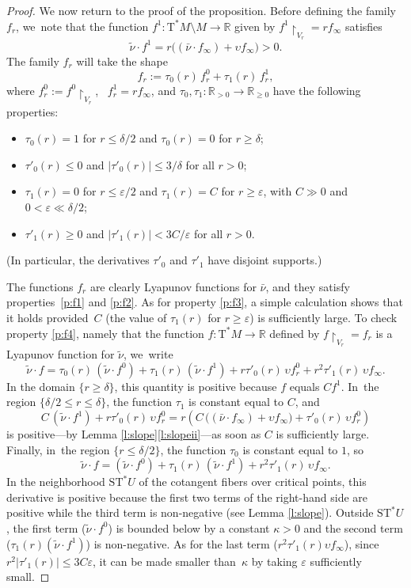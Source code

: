\documentclass[10pt]{amsart}
\newcommand{\R}{{\mathbb R}}
\newcommand{\sT}{\mathrm{T}^\ast}
\newcommand{\sST}{\mathrm{ST}^\ast}
\newcommand{\hnu}{\tilde\nu}
\newcommand{\cnu}{\bar\nu}
\newcommand{\de}{\mathrel{:=}}
\newcommand{\rst}[1]{{\upharpoonright}_{\!#1}}
\let\on\colon
\let\ups\upsilon
\let\eps\varepsilon
\theoremstyle{plain}
\theoremstyle{definition}
\begin{document}
\begin{proof}
We now return to the proof of the proposition. Before defining the family $f_r$, we~note that the function $f^1 \on \sT M \setminus M \to \R$ given by $f^1 \rst{ V_r }
= rf_\infty$ satisfies
\[
\hnu \cdot f^1 =
	r \bigl((\cnu \cdot f_\infty) + \ups f_\infty\bigr) > 0.
\]
The family $f_r$ will take the shape
\[
f_r \de \tau_0(r)\, f_r^0 + \tau_1(r)\, f_r^1,
\]
where $f_r^0 \de f^0 \rst{ V_r }$, \ $f_r^1 = rf_\infty$, and $\tau_0, \tau_1
\on \R_{>0} \to \R_{\ge0}$ have the following properties:
\begin{itemize}
\item
$\tau_0(r) = 1$ for $r \le \delta/2$ and $\tau_0(r) = 0$ for $r \ge \delta$;
\item
$\tau'_0(r) \le 0$ and $|\tau'_0(r)| \le 3/\delta$ for all $r>0$;
\item
$\tau_1(r) = 0$ for $r \le \eps/2$ and $\tau_1(r) = C$ for $r \ge \eps$, with
$C \gg 0$ and $0 < \eps \ll \delta/2$;
\item
$\tau'_1(r) \ge 0$ and $|\tau'_1(r)| < 3C / \eps$ for all $r>0$.
\end{itemize}
(In particular, the derivatives $\tau'_0$ and $\tau'_1$ have disjoint supports.)

The functions $f_r$ are clearly Lyapunov functions for $\cnu$, and they satisfy
properties~\eqref{p:f1} and \eqref{p:f2}. As for property \eqref{p:f3}, a simple calculation shows that it
holds provided~$C$ (the value of $\tau_1(r)$ for $r \ge \eps$) is sufficiently
large. To check property \eqref{p:f4}, namely that the function $f \on \sT M \to \R$ defined by $f \rst{ V_r } = f_r$ is a Lyapunov function for $\hnu$, we~write
\[
\hnu \cdot f =
	\tau_0(r)\, (\hnu \cdot f^0) + \tau_1(r)\, (\hnu \cdot f^1)
	+ r \tau'_0(r)\, \ups f_r^0 + r^2 \tau'_1(r)\, \ups f_\infty.
\]
In the domain $\{r \ge \delta\}$, this quantity is positive because $f$ equals
$C f^1$. In~the region $\{\delta/2 \le r \le \delta\}$, the function $\tau_1$ is
constant equal to $C$, and
\[
C\, (\hnu \cdot f^1) + r \tau'_0(r)\, \ups f_r^0
	= r \left(C\, \bigl((\cnu \cdot f_\infty) + \ups f_\infty\bigr)
	+ \tau'_0(r)\, \ups f_r^0\right)
\]
is positive---by Lemma \ref{l:slope}\eqref{l:slopeii}---as soon as $C$ is sufficiently
large. Finally, in~the region $\{r \le \delta/2\}$, the function $\tau_0$ is
constant equal to $1$, so
\[
\hnu \cdot f = (\hnu \cdot f^0)
	+ \tau_1(r)\, (\hnu \cdot f^1) + r^2 \tau'_1(r)\, \ups f_\infty.
\]
In the neighborhood $\sST U$ of the cotangent fibers over critical points, this
derivative is positive because the first two terms of the right-hand side are
positive while the third term is non-negative (see Lemma \ref{l:slope}). Outside
$\sST U$, the first term ($\hnu \cdot f^0$) is bounded below by a constant
$\kappa>0$ and the second term ($\tau_1(r) (\hnu \cdot f^1)$) is non-negative.
As for the last term ($r^2\tau'_1(r) \ups f_\infty$), since $r^2 |\tau'_1(r)|
\le 3C\eps$, it can be made smaller than~$\kappa$ by taking $\eps$ sufficiently
small.


\end{proof}
\end{document}

